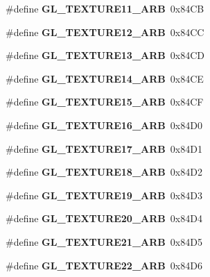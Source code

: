 \begin{DoxyCompactItemize}
\item 
\#define {\bfseries G\+L\+\_\+\+T\+E\+X\+T\+U\+R\+E11\+\_\+\+A\+R\+B}~0x84\+C\+B\label{_s_d_l__opengl_8h_aceb7a2ccaecfde6c623b84f126db07f7}

\item 
\#define {\bfseries G\+L\+\_\+\+T\+E\+X\+T\+U\+R\+E12\+\_\+\+A\+R\+B}~0x84\+C\+C\label{_s_d_l__opengl_8h_a67cfe435b4c26fb4660963eb33b170e3}

\item 
\#define {\bfseries G\+L\+\_\+\+T\+E\+X\+T\+U\+R\+E13\+\_\+\+A\+R\+B}~0x84\+C\+D\label{_s_d_l__opengl_8h_a007d7adc732a72614650b6286828e12a}

\item 
\#define {\bfseries G\+L\+\_\+\+T\+E\+X\+T\+U\+R\+E14\+\_\+\+A\+R\+B}~0x84\+C\+E\label{_s_d_l__opengl_8h_a0d9434f43e17c5e54acd60032d7b24df}

\item 
\#define {\bfseries G\+L\+\_\+\+T\+E\+X\+T\+U\+R\+E15\+\_\+\+A\+R\+B}~0x84\+C\+F\label{_s_d_l__opengl_8h_ab5b376fa3be9af7c8dca9e6796e7a467}

\item 
\#define {\bfseries G\+L\+\_\+\+T\+E\+X\+T\+U\+R\+E16\+\_\+\+A\+R\+B}~0x84\+D0\label{_s_d_l__opengl_8h_a0a7609a188daa51d92323efec12521f0}

\item 
\#define {\bfseries G\+L\+\_\+\+T\+E\+X\+T\+U\+R\+E17\+\_\+\+A\+R\+B}~0x84\+D1\label{_s_d_l__opengl_8h_a7ff96afdff3dd5d0020643dcfedddd0f}

\item 
\#define {\bfseries G\+L\+\_\+\+T\+E\+X\+T\+U\+R\+E18\+\_\+\+A\+R\+B}~0x84\+D2\label{_s_d_l__opengl_8h_a3009d9288b5ff6a7218a04efb42f94f0}

\item 
\#define {\bfseries G\+L\+\_\+\+T\+E\+X\+T\+U\+R\+E19\+\_\+\+A\+R\+B}~0x84\+D3\label{_s_d_l__opengl_8h_a6b2f54a8037012a8dc8e10146b29ba4c}

\item 
\#define {\bfseries G\+L\+\_\+\+T\+E\+X\+T\+U\+R\+E20\+\_\+\+A\+R\+B}~0x84\+D4\label{_s_d_l__opengl_8h_aa050e993492ce097cf0273be4838014f}

\item 
\#define {\bfseries G\+L\+\_\+\+T\+E\+X\+T\+U\+R\+E21\+\_\+\+A\+R\+B}~0x84\+D5\label{_s_d_l__opengl_8h_a8cd9b3a28066afd7694b4fc4c9629f80}

\item 
\#define {\bfseries G\+L\+\_\+\+T\+E\+X\+T\+U\+R\+E22\+\_\+\+A\+R\+B}~0x84\+D6\label{_s_d_l__opengl_8h_a57e5fe52a954449546b89da9f45fd415}


\end{DoxyCompactItemize}
